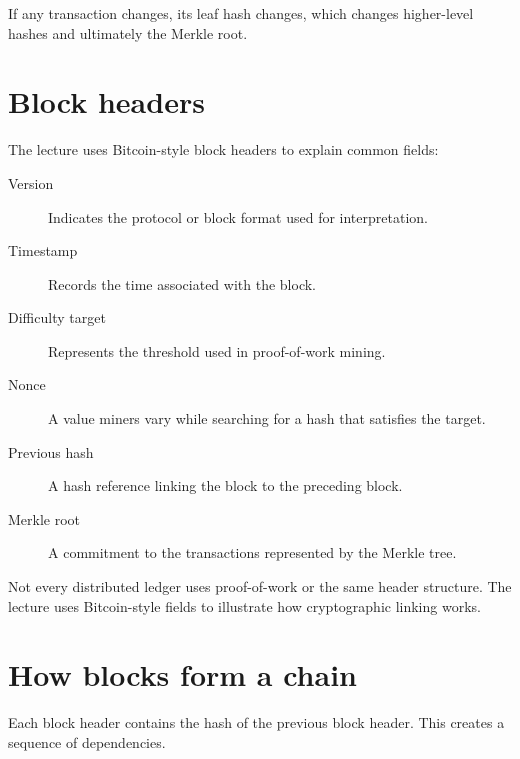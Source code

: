 If any transaction changes, its leaf hash changes, which changes higher-level hashes and ultimately the Merkle root.

\section{Block headers}

The lecture uses Bitcoin-style block headers to explain common fields:

\begin{description}
  \item[Version] Indicates the protocol or block format used for interpretation.
  \item[Timestamp] Records the time associated with the block.
  \item[Difficulty target] Represents the threshold used in proof-of-work mining.
  \item[Nonce] A value miners vary while searching for a hash that satisfies the target.
  \item[Previous hash] A hash reference linking the block to the preceding block.
  \item[Merkle root] A commitment to the transactions represented by the Merkle tree.
\end{description}

Not every distributed ledger uses proof-of-work or the same header structure. The lecture uses Bitcoin-style fields to illustrate how cryptographic linking works.

\section{How blocks form a chain}

Each block header contains the hash of the previous block header. This creates a sequence of dependencies.

\begin{mlfigure}
\end{mlfigure}

